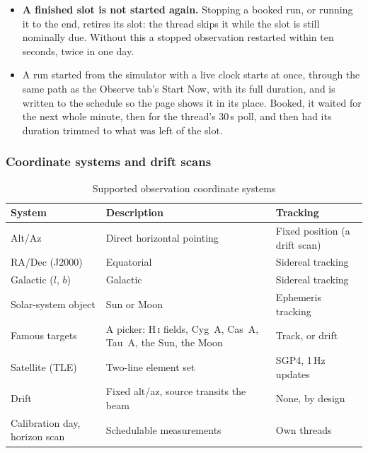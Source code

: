 \documentclass[11pt,a4paper]{article}
\begin{document}
\begin{itemize}
    \item \textbf{A finished slot is not started again.} Stopping a booked run, or running it to the end, retires its slot: the thread skips it while the slot is still nominally due. Without this a stopped observation restarted within ten seconds, twice in one day.
    \item A run started from the simulator with a live clock starts at once, through the same path as the Observe tab's Start Now, with its full duration, and is written to the schedule so the page shows it in its place. Booked, it waited for the next whole minute, then for the thread's 30\,s poll, and then had its duration trimmed to what was left of the slot.
\end{itemize}

\subsubsection{Coordinate systems and drift scans}

\begin{table}[H]
\centering
\caption{Supported observation coordinate systems}
\begin{tabular}{lll}
\toprule
\textbf{System} & \textbf{Description} & \textbf{Tracking} \\
\midrule
Alt/Az & Direct horizontal pointing & Fixed position (a drift scan) \\
RA/Dec (J2000) & Equatorial & Sidereal tracking \\
Galactic ($l$, $b$) & Galactic & Sidereal tracking \\
Solar-system object & Sun or Moon & Ephemeris tracking \\
Famous targets & A picker: H\,\textsc{i} fields, Cyg~A, Cas~A, Tau~A, the Sun, the Moon & Track, or drift \\
Satellite (TLE) & Two-line element set & SGP4, 1\,Hz updates \\
Drift & Fixed alt/az, source transits the beam & None, by design \\
Calibration day, horizon scan & Schedulable measurements & Own threads \\
\bottomrule
\end{tabular}
\end{table}
\end{document}
